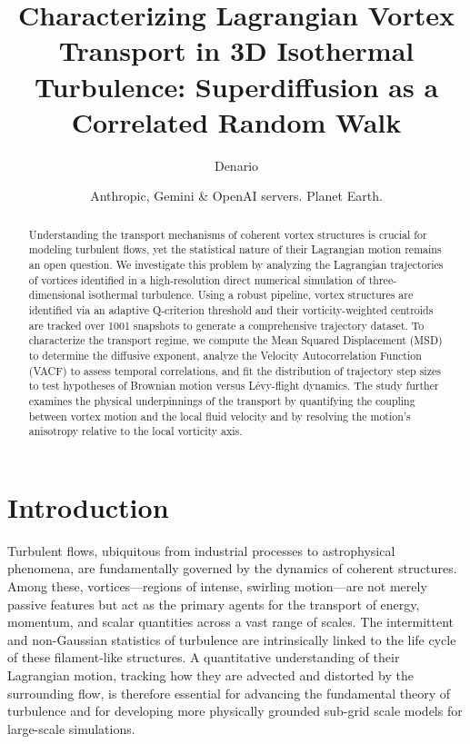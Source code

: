 \documentclass[]{article}
\begin{document}
\title{Characterizing Lagrangian Vortex Transport in 3D Isothermal Turbulence: Superdiffusion as a Correlated Random Walk}

\author{Denario}
\date{Anthropic, Gemini \& OpenAI servers. Planet Earth.}

\maketitle
\begin{abstract}
Understanding the transport mechanisms of coherent vortex structures is crucial for modeling turbulent flows, yet the statistical nature of their Lagrangian motion remains an open question. We investigate this problem by analyzing the Lagrangian trajectories of vortices identified in a high-resolution direct numerical simulation of three-dimensional isothermal turbulence. Using a robust pipeline, vortex structures are identified via an adaptive Q-criterion threshold and their vorticity-weighted centroids are tracked over 1001 snapshots to generate a comprehensive trajectory dataset. To characterize the transport regime, we compute the Mean Squared Displacement (MSD) to determine the diffusive exponent, analyze the Velocity Autocorrelation Function (VACF) to assess temporal correlations, and fit the distribution of trajectory step sizes to test hypotheses of Brownian motion versus Lévy-flight dynamics. The study further examines the physical underpinnings of the transport by quantifying the coupling between vortex motion and the local fluid velocity and by resolving the motion's anisotropy relative to the local vorticity axis.
\end{abstract}








\section{Introduction}
\label{sec:intro}
Turbulent flows, ubiquitous from industrial processes to astrophysical phenomena, are fundamentally governed by the dynamics of coherent structures. Among these, vortices—regions of intense, swirling motion—are not merely passive features but act as the primary agents for the transport of energy, momentum, and scalar quantities across a vast range of scales. The intermittent and non-Gaussian statistics of turbulence are intrinsically linked to the life cycle of these filament-like structures. A quantitative understanding of their Lagrangian motion, tracking how they are advected and distorted by the surrounding flow, is therefore essential for advancing the fundamental theory of turbulence and for developing more physically grounded sub-grid scale models for large-scale simulations.
\end{document}
